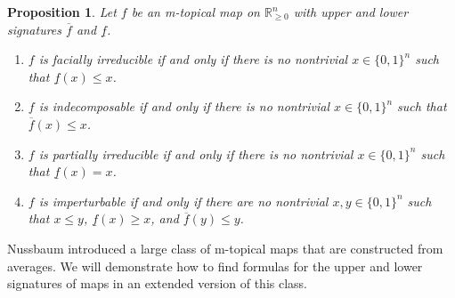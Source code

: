 \documentclass[10pt,reqno]{amsart}
\newcommand{\R}{\mathbb{R}}
\newcommand{\sign}{\operatorname{sgn}}
\theoremstyle{plain}
\newtheorem{proposition}[theorem]{Proposition}
\theoremstyle{definition}
\numberwithin{equation}{section}
\begin{document}
\begin{proposition}
Let $f$ be an m-topical map on $\R^n_{\ge 0}$ with upper and lower signatures $\overline{f}$ and $\underline{f}$.  
\begin{enumerate}
\item $f$ is facially irreducible if and only if there is no nontrivial $x \in \{0,1\}^n$ such that $\underline{f}(x) \le x$. 
\item $f$ is indecomposable if and only if there is no nontrivial $x \in \{0,1\}^n$ such that $\overline{f}(x) \le x$. 
\item $f$ is partially irreducible if and only if there is no nontrivial $x \in \{0,1\}^n$ such that $\underline{f}(x) = x$. 
\item $f$ is imperturbable if and only if there are no nontrivial $x, y \in \{0,1\}^n$ such that $x \le y$, $\underline{f}(x) \ge x$, and $\overline{f}(y) \le y$. 
\end{enumerate}
\end{proposition}



Nussbaum \cite{Nussbaum89} introduced a large class of m-topical maps that are constructed from averages. We will demonstrate how to find formulas for the upper and lower signatures of maps in an extended version of this class.  
\end{document}
